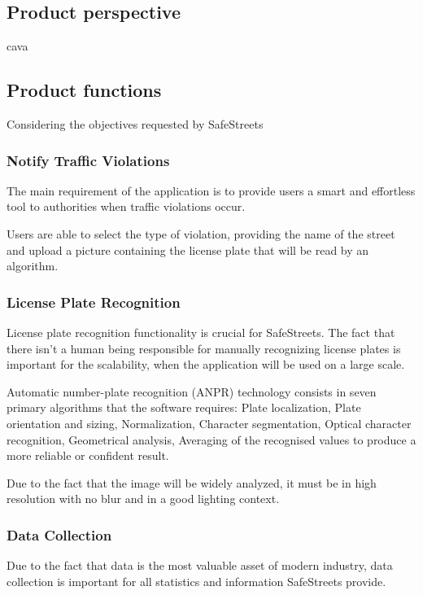 \subsection{Product perspective}

cava

\subsection{Product functions}

Considering the objectives requested by SafeStreets

\subsubsection{Notify Traffic Violations}
The main requirement of the application is to provide users a smart and effortless tool to authorities when traffic violations occur.

Users are able to select the type of violation, providing the name of the street and upload a picture containing the license plate that will be read by an algorithm.

\subsubsection{License Plate Recognition}
License plate recognition functionality is crucial for SafeStreets. The fact that there isn't a human being responsible for manually recognizing license plates is important for the scalability, when the application will be used on a large scale.

Automatic number-plate recognition (ANPR) technology consists in seven primary algorithms that the software requires: Plate localization, Plate orientation and sizing, Normalization, Character segmentation, Optical character recognition, Geometrical analysis, Averaging of the recognised values to produce a more reliable or confident result.

Due to the fact that the image will be widely analyzed, it must be in high resolution with no blur and in a good lighting context.

\subsubsection{Data Collection}
Due to the fact that data is the most valuable asset of modern industry, data collection is important for all statistics and information SafeStreets provide.

